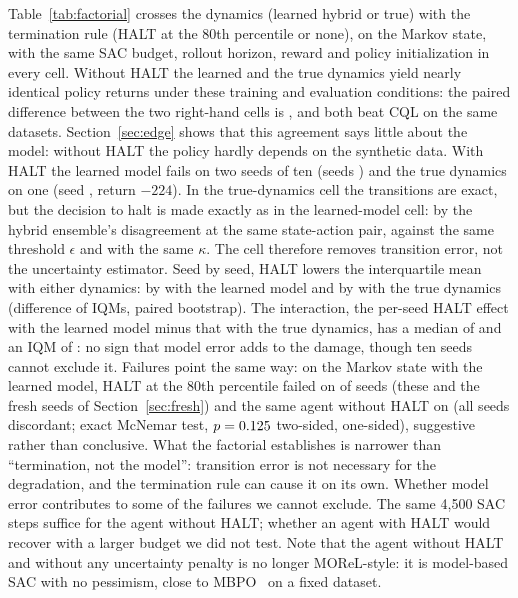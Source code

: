 \documentclass[11pt]{article}
\begin{document}
Table~\ref{tab:factorial} crosses the dynamics (learned hybrid or true) with the termination rule (HALT at the 80th percentile or none), on the Markov state, with the same SAC budget, rollout horizon, reward and policy initialization in every cell. Without HALT the learned and the true dynamics yield nearly identical policy returns under these training and evaluation conditions: the paired difference between the two right-hand cells is , and both beat CQL on the same datasets. Section~\ref{sec:edge} shows that this agreement says little about the model: without HALT the policy hardly depends on the synthetic data. With HALT the learned model fails on two seeds of ten (seeds \failslearned) and the true dynamics on one (seed \failstrue, return $-224$). In the true-dynamics cell the transitions are exact, but the decision to halt is made exactly as in the learned-model cell: by the hybrid ensemble's disagreement at the same state-action pair, against the same threshold $\epsilon$ and with the same $\kappa$. The cell therefore removes transition error, not the uncertainty estimator. Seed by seed, HALT lowers the interquartile mean with either dynamics: by \dhaltlearned{} with the learned model and by \dhalttrue{} with the true dynamics (difference of IQMs, paired bootstrap). The interaction, the per-seed HALT effect with the learned model minus that with the true dynamics, has a median of \interactionmedian{} and an IQM of \interactioniqm{}: no sign that model error adds to the damage, though ten seeds cannot exclude it. Failures point the same way: on the Markov state with the learned model, HALT at the 80th percentile failed on \haltonfails{} of \haltseeds{} seeds (these and the fresh seeds of Section~\ref{sec:fresh}) and the same agent without HALT on \haltofffails{} (all \haltonfails{} seeds discordant; exact McNemar test, $p=0.125$ two-sided, \haltmcnemarone{} one-sided), suggestive rather than conclusive. What the factorial establishes is narrower than ``termination, not the model'': transition error is not necessary for the degradation, and the termination rule can cause it on its own. Whether model error contributes to some of the failures we cannot exclude. The same 4{,}500 SAC steps suffice for the agent without HALT; whether an agent with HALT would recover with a larger budget we did not test. Note that the agent without HALT and without any uncertainty penalty is no longer MOReL-style: it is model-based SAC with no pessimism, close to MBPO~\citep{janner2019mbpo} on a fixed dataset.
\end{document}
